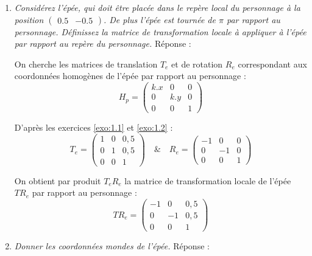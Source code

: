 \documentclass[a4paper,12pt]{article}
\begin{document}
\begin{enumerate}
    \item \emph{Considérez l'épée, qui doit être placée dans le repère local du personnage à la position $\begin{pmatrix} 0.5 & -0.5 \end{pmatrix}$. De plus l'épée est tournée de $\pi$ par rapport au personnage. Définissez la matrice de transformation locale à appliquer à l'épée par rapport au repère du personnage.}\newline \newline
Réponse :

On cherche les matrices de translation $T_e$ et de rotation $R_e$ correspondant aux coordonnées homogènes de l'épée par rapport au personnage : 
 \begin{equation}
H_p = 
\begin{pmatrix}
k.x & 0 & 0 \\
0 & k.y & 0 \\
0 & 0 & 1
\end{pmatrix} \end{equation}

D'après les exercices \ref{exo:1.1} et \ref{exo:1.2} : \newline
 \begin{equation}
T_e = 
\begin{pmatrix}
1 & 0 & 0,5 \\
0 & 1 & 0,5 \\
0 & 0 & 1
\end{pmatrix}
\quad \& \quad
R_e = 
\begin{pmatrix}
-1 & 0 & 0 \\
0 & -1 & 0 \\
0 & 0 & 1
\end{pmatrix} \end{equation}

On obtient par produit $T_e R_e$ la matrice de transformation locale de l'épée $TR_e$ par rapport au personnage : 
 \begin{equation}\boxed{
TR_e = 
\begin{pmatrix}
-1 & 0 & 0,5 \\
0 & -1 & 0,5 \\
0 & 0 & 1
\end{pmatrix}} \end{equation}

    \item \emph{Donner les coordonnées mondes de l'épée.}\newline \newline
Réponse :


\end{enumerate}
\end{document}
